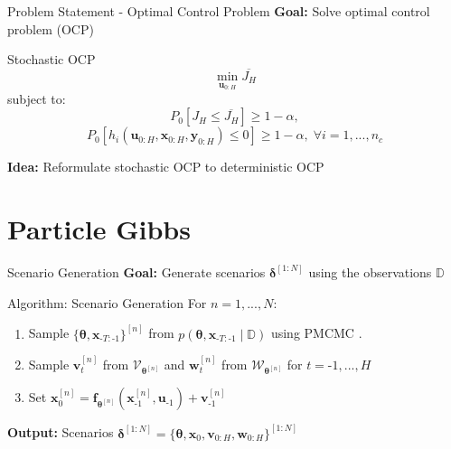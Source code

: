 \documentclass[student, noshadow, itr, english, aspectratio=169]{ITR_LSR_slides}
\begin{document}
\begin{frame}{Problem Statement - Optimal Control Problem}	
	\textbf{Goal:} Solve optimal control problem (OCP)\\
	\begin{block}{Stochastic OCP}
		\begin{equation*}
		\min\limits_{\boldsymbol{u}_{0:H}} \overline{J_H}
		\end{equation*}
		subject to: 
		\begin{equation*}
		P_0 \left[J_H \leq \overline{J_H} \right] \geq 1 - \alpha,
		\end{equation*}
		\begin{equation*}
		P_0 \left[ h_i(\boldsymbol{u}_{0:H},  \boldsymbol{x}_{0:H},  \boldsymbol{y}_{0:H}) \leq 0 \right] \geq 1 - \alpha, \; \forall i = 1,...,n_c
		\end{equation*}
	\end{block}	
	\textbf{Idea:} Reformulate stochastic OCP to deterministic OCP
\end{frame}


\section{Particle Gibbs}

\begin{frame}{Scenario Generation}
\textbf{Goal:} Generate scenarios $\boldsymbol{\delta}^{[1:N]}$ using the observations $\mathbb{D}$\\
\begin{block}{Algorithm: Scenario Generation}
For $n = 1,...,N$:
\begin{enumerate}
  \item Sample $\{ \boldsymbol{\theta}, \boldsymbol{x}_{\text{-}T:\text{-}1} \}^{[n]}$ from $p\left( \boldsymbol{\theta}, \boldsymbol{x}_{\text{-}T:\text{-}1} \mid \mathbb{D} \right)$ using PMCMC \cite{Robert_24}.
  \item Sample $\boldsymbol{v}_t^{[n]}$ from $\boldsymbol{\mathcal{V}}_{\boldsymbol{\theta}^{[n]}}$ and  $\boldsymbol{w}_t^{[n]}$ from $\boldsymbol{\mathcal{W}}_{\boldsymbol{\theta}^{[n]}}$ for $t = \text{-}1, ..., H$
  \item Set $\boldsymbol{x}_0^{[n]} = \boldsymbol{f}_{\boldsymbol{\theta}^{[n]}} \left( \boldsymbol{x}_{\text{-} 1}^{[n]}, \boldsymbol{u}_{\text{-} 1} \right) + \boldsymbol{v}_{\text{-} 1}^{[n]}$
\end{enumerate}
\textbf{Output:} Scenarios $\boldsymbol{\delta}^{[1:N]} = \{ \boldsymbol{\theta}, \boldsymbol{x}_0, \boldsymbol{v}_{0:H}, \boldsymbol{w}_{0:H}\}^{[1:N]}$
\end{block}
\end{frame}
\end{document}
